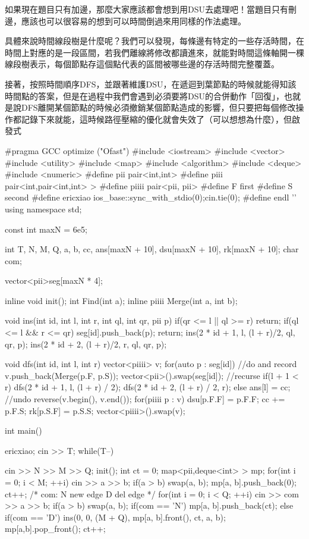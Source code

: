 如果現在題目只有加邊，那麼大家應該都會想到用DSU去處理吧！當題目只有刪邊，應該也可以很容易的想到可以時間倒過來用同樣的作法處理。

具體來說時間線段樹是什麼呢？我們可以發現，每條邊有特定的一些存活時間，在時間上對應的是一段區間，若我們離線將修改都讀進來，就能對時間這條軸開一棵線段樹表示，每個節點存這個點代表的區間被哪些邊的存活時間完整覆蓋。

接著，按照時間順序DFS，並跟著維護DSU，在遞迴到葉節點的時候就能得知該時間點的答案，但是在過程中我們會遇到必須要將DSU的合併動作「回復」，也就是說DFS離開某個節點的時候必須撤銷某個節點造成的影響，但只要把每個修改操作都記錄下來就能，這時候路徑壓縮的優化就會失效了（可以想想為什麼），但啟發式
\begin{C++}
#pragma GCC optimize ("Ofast")
#include <iostream>
#include <vector>
#include <utility>
#include <map>
#include <algorithm>
#include <deque>
#include <numeric>
#define pii pair<int,int>
#define piii pair<int,pair<int,int> >
#define piiii pair<pii, pii>
#define F first
#define S second
#define ericxiao ios_base::sync_with_stdio(0);cin.tie(0);
#define endl '\n'
using namespace std;

const int maxN = 6e5;

int T, N, M, Q, a, b, cc, ans[maxN + 10], dsu[maxN + 10], rk[maxN + 10];
char com;

vector<pii>seg[maxN * 4];


inline void init();
int  Find(int a);
inline piiii Merge(int a, int b);

void ins(int id, int l, int r, int ql, int qr, pii p){
    if(qr <= l || ql >= r) return;
    if(ql <= l && r <= qr){
        seg[id].push_back(p);
        return;
    }
    ins(2 * id + 1, l, (l + r)/2, ql, qr, p);
    ins(2 * id + 2, (l + r)/2, r, ql, qr, p);
}


void dfs(int id, int l, int r){
    vector<piiii> v;
    for(auto p : seg[id]){
        //do and record
        v.push_back(Merge(p.F, p.S));
    }
    vector<pii>().swap(seg[id]);
    //recurse
    if(l + 1 < r){
        dfs(2 * id + 1, l, (l + r) / 2);
        dfs(2 * id + 2, (l + r) / 2, r);
    } else {
        ans[l] = cc;
    }
    //undo
    reverse(v.begin(), v.end());
    for(piiii p : v){
        dsu[p.F.F] = p.F.F;
        cc += p.F.S;
        rk[p.S.F] = p.S.S;
    }
    vector<piiii>().swap(v);
}

int main(){
    ericxiao;
    cin >> T;
    while(T--){
        cin >> N >> M >> Q;
        init();
        int ct = 0;
        map<pii,deque<int> > mp;
        for(int i = 0; i < M; ++i){
            cin >> a >> b;
            if(a > b) swap(a, b);
            mp[{a, b}].push_back(0);
            ct++;
        }
        /*
        com:
        N new edge
        D del edge
        */
        for(int i = 0; i < Q; ++i){
            cin >> com >> a >> b;
            if(a > b) swap(a, b);
            if(com == 'N'){
                mp[{a, b}].push_back(ct);
            } else if(com == 'D') {
                ins(0, 0, (M + Q), mp[{a, b}].front(), ct, {a, b});
                mp[{a,b}].pop_front();
            }
            ct++;
        }

}}
\end{C++}
